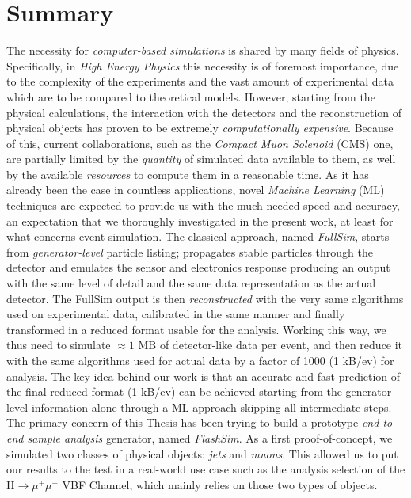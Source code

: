 \begingroup
\let\clearpage\relax
\let\cleardoublepage\relax
\let\cleardoublepage\relax

\chapter*{Summary}
The necessity for \emph{computer-based simulations} is shared by many fields of physics. Specifically, in \emph{High Energy Physics} this necessity is of foremost importance, due to the complexity of the experiments and the vast amount of experimental data which are to be compared to theoretical models. However, starting from the physical calculations, the interaction with the detectors and the reconstruction of physical objects has proven to be extremely \emph{computationally expensive}. Because of this, current collaborations, such as the \emph{Compact Muon Solenoid} (CMS) one, are partially limited by the \emph{quantity} of simulated data available to them, as well by the available \emph{resources} to compute them in a reasonable time. As it has already been the case in countless applications, novel \emph{Machine Learning} (ML) techniques are expected to provide us with the much needed speed and accuracy, an expectation that we thoroughly investigated in the present work, at least for what concerns event simulation. 
The classical approach, named \emph{FullSim}, starts from \emph{generator-level} particle listing; propagates stable particles through the detector and emulates the sensor and electronics response producing an output with the same level of detail and the same data representation as the actual detector. The FullSim output is then \emph{reconstructed} with the very same algorithms used on experimental data, calibrated in the same manner and finally transformed in a reduced format usable for the analysis. Working this way, we thus need to simulate $\approx 1$ MB of detector-like data per event, and then reduce it with the same algorithms used for actual data by a factor of 1000 (1 kB/ev) for analysis.
The key idea behind our work is that an accurate and fast prediction of the final reduced format (1 kB/ev) can be achieved starting from the generator-level information alone through a ML approach skipping all intermediate steps. The primary concern of this Thesis has been trying to build a prototype \emph{end-to-end sample analysis} generator, named \emph{FlashSim}.
As a first proof-of-concept, we simulated two classes of physical objects: \emph{jets} and \emph{muons}. This allowed us to put our results to the test in a real-world use case such as the analysis selection  of the H$\rightarrow\mu^+\mu^-$ VBF Channel, which mainly relies on those two types of objects.


